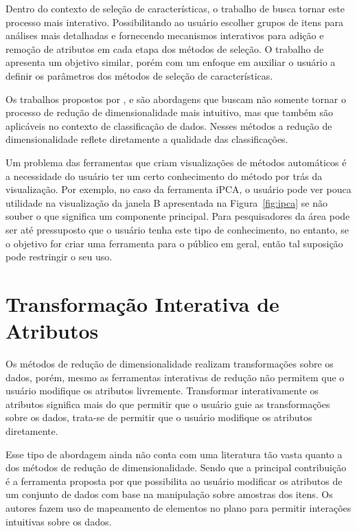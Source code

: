 Dentro do contexto de seleção de características, o trabalho
de \cite{Dy2000} busca tornar este processo mais interativo.
Possibilitando ao usuário escolher grupos de itens para
análises mais detalhadas e fornecendo mecanismos interativos
para adição e remoção de atributos em cada etapa dos métodos
de seleção. O trabalho de \cite{Brandoli2010} apresenta um
objetivo similar, porém com um enfoque em auxiliar o
usuário a definir os parâmetros dos métodos de seleção de
características.

Os trabalhos propostos por \cite{Choo2010}, \cite{Paiva2012}
e \cite{Zhang2006} são abordagens que buscam não somente
tornar o processo de redução de dimensionalidade mais
intuitivo, mas que também são aplicáveis no contexto de
classificação de dados. Nesses métodos a redução de
dimensionalidade reflete diretamente a qualidade das
classificações. 

Um problema das ferramentas que criam visualizações de métodos
automáticos é a necessidade do usuário ter um certo
conhecimento do método por trás da visualização. Por
exemplo, no caso da ferramenta iPCA, o usuário pode ver
pouca utilidade na visualização da janela B apresentada na
Figura~\ref{fig:ipca} se não souber o que significa um
componente principal. Para pesquisadores da área pode ser
até pressuposto que o usuário tenha este tipo de
conhecimento, no entanto, se o objetivo for criar uma
ferramenta para o público em geral, então tal suposição pode
restringir o seu uso.

\section{Transformação Interativa de Atributos}

Os métodos de redução de dimensionalidade realizam
transformações sobre os dados, porém, mesmo as ferramentas
interativas de redução não permitem que o usuário modifique
os atributos livremente. Transformar interativamente os
atributos significa mais do que permitir que o usuário
guie as transformações sobre os dados, trata-se de permitir
que o usuário modifique os atributos diretamente. 

Esse tipo de abordagem ainda não conta com uma literatura
tão vasta quanto a dos métodos de redução de
dimensionalidade.  Sendo que a principal contribuição é a
ferramenta proposta por \cite{Gladys2013} que possibilita ao
usuário modificar os atributos de um conjunto de dados com
base na manipulação sobre amostras dos itens. Os autores
fazem uso de mapeamento de elementos no plano para permitir
interações intuitivas sobre os dados.

